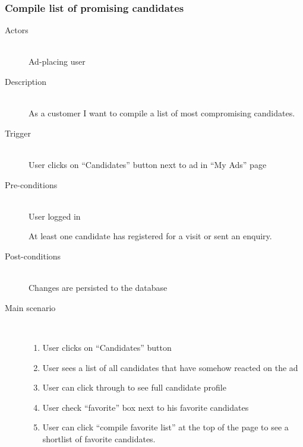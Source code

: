 \documentclass[a4wide]{article}
\begin{document}
\subsubsection{Compile list of promising candidates}
\begin{description}
\item[Actors]\mbox{}\\
Ad-placing user
\item[Description]\mbox{}\\
As a customer I want to compile a list of most compromising candidates.
\item[Trigger]\mbox{}\\
User clicks on “Candidates” button next to ad in “My Ads” page
\item[Pre-conditions]\mbox{}\\
 User logged in
 
 At least one candidate has registered for a visit or sent an enquiry.
\item[Post-conditions]\mbox{}\\
Changes are persisted to the database
\item[Main scenario]\mbox{}\\
\begin{enumerate}
\item User clicks on “Candidates” button
\item User sees a list of all candidates that have somehow reacted on the ad 
\item User can click through to see full candidate profile
\item User check “favorite” box next to his favorite candidates
\item User can click “compile favorite list” at the top of the page to see a shortlist of favorite candidates. 
\end{enumerate}
\end{description}
\end{document}
